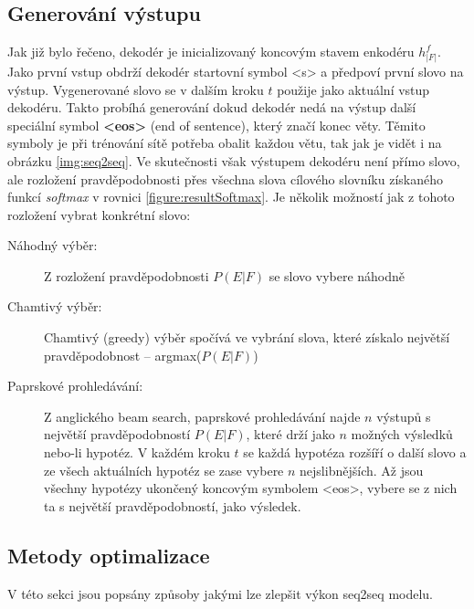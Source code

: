 \subsection{Generování výstupu}
Jak již bylo řečeno, dekodér je inicializovaný koncovým stavem enkodéru $h^{f}_{|F|}$. Jako první vstup obdrží dekodér startovní symbol <s> a předpoví první slovo na výstup. Vygenerované slovo se v dalším kroku $t$ použije jako aktuální vstup dekodéru. Takto probíhá generování dokud dekodér nedá na výstup další speciální symbol \textbf{<eos>} (end of sentence), který značí konec věty. Těmito symboly je při trénování sítě potřeba obalit každou větu, tak jak je vidět i na obrázku \ref{img:seq2seq}. Ve skutečnosti však výstupem dekodéru není přímo slovo, ale rozložení pravděpodobnosti přes všechna slova cílového slovníku získaného funkcí \emph{softmax} v rovnici \ref{figure:resultSoftmax}. Je několik možností jak z tohoto rozložení vybrat konkrétní slovo:

\begin{description}
  \item[Náhodný výběr:] Z rozložení pravděpodobnosti $P(E|F)$ se slovo vybere náhodně
  \item[Chamtivý výběr:] Chamtivý (greedy) výběr spočívá ve vybrání slova, které získalo největší pravděpodobnost -- argmax($P(E|F)$)
  \item[Paprskové prohledávání:] Z anglického beam search, paprskové prohledávání najde $n$ výstupů s největší pravděpodobností $P(E|F)$, které drží jako $n$ možných výsledků nebo-li hypotéz. V každém kroku $t$ se každá hypotéza rozšíří o další slovo a ze všech aktuálních hypotéz se zase vybere $n$ nejslibnějších. Až jsou všechny hypotézy ukončený koncovým symbolem <eos>, vybere se z nich ta s největší pravděpodobností, jako výsledek.
\end{description}



\subsection{Metody optimalizace}
V této sekci jsou popsány způsoby jakými lze zlepšit výkon seq2seq modelu.

